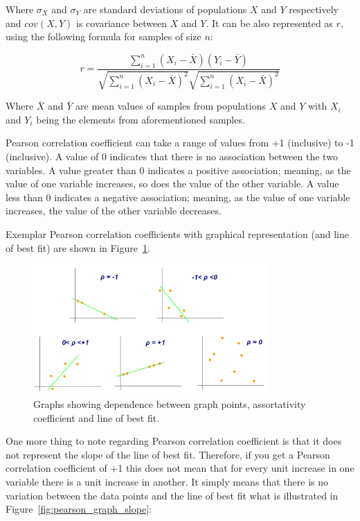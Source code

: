 Where $\sigma_X$ and $\sigma_Y$ are standard deviations of populations $X$ and $Y$ respectively and $cov(X,Y)$ is covariance between $X$ and $Y$.
It can be also represented as $r$, using the following formula for samples of size $n$:

$$r = \frac{\sum_{i=1}^{n} (X_i - \bar{X}) (Y_i - \bar{Y}) }
{ \sqrt{\sum_{i=1}^{n} (X_i - \bar{X})^2} \sqrt{\sum_{i=1}^{n} (X_i - \bar{X})^2} }$$

Where $\bar{X}$ and $\bar{Y}$ are mean values of samples from populations $X$ and $Y$ with $X_i$ and $Y_i$ being the elements from aforementioned samples.

Pearson correlation coefficient can take a range of values from +1 (inclusive) to -1 (inclusive).
A value of 0 indicates that there is no association between the two variables.
A value greater than 0 indicates a positive association; meaning, as the value of one variable increases, so does the value of the other variable.
A value less than 0 indicates a negative association; meaning, as the value of one variable increases, the value of the other variable decreases.

Exemplar Pearson correlation coefficients with graphical representation (and line of best fit) are shown in Figure~\ref{fig:pearson_graph}.

\begin{figure}[h!]
  \centering
  \captionsetup{justification=centering}
    \includegraphics[width=0.8\textwidth]{images/pearson_graphs.png}
  \caption{Graphs showing dependence between graph points, assortativity coefficient and line of best fit.\cite{wiki_pearson}}
  \label{fig:pearson_graph}
\end{figure}

One more thing to note regarding Pearson correlation coefficient is that it does not represent the slope of the line of best fit.
Therefore, if you get a Pearson correlation coefficient of +1 this does not mean that for every unit increase in one variable there is a unit increase in another.
It simply means that there is no variation between the data points and the line of best fit what is illustrated in Figure~\ref{fig:pearson_graph_slope}:

